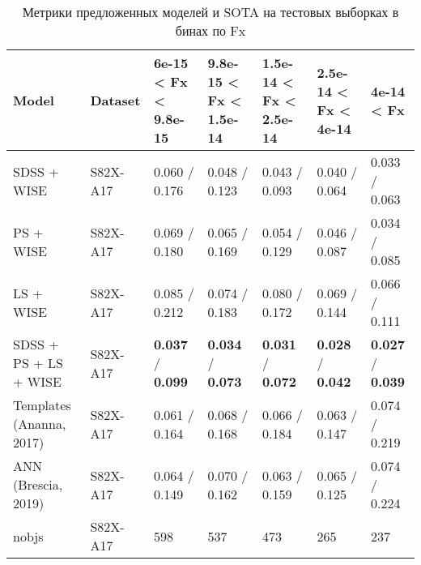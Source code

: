 \begin{table*}
    \centering
    \begin{tabular}{lllllll}
    \hline
                        Model &   Dataset &             6e-15 < Fx < 9.8e-15 &           9.8e-15 < Fx < 1.5e-14 &           1.5e-14 < Fx < 2.5e-14 &             2.5e-14 < Fx < 4e-14 &                       4e-14 < Fx \\
    \hline
                  SDSS + WISE &  S82X-A17 &                    0.060 / 0.176 &                    0.048 / 0.123 &                    0.043 / 0.093 &                    0.040 / 0.064 &                    0.033 / 0.063 \\
                    PS + WISE &  S82X-A17 &                    0.069 / 0.180 &                    0.065 / 0.169 &                    0.054 / 0.129 &                    0.046 / 0.087 &                    0.034 / 0.085 \\
                    LS + WISE &  S82X-A17 &                    0.085 / 0.212 &                    0.074 / 0.183 &                    0.080 / 0.172 &                    0.069 / 0.144 &                    0.066 / 0.111 \\
        SDSS + PS + LS + WISE &  S82X-A17 &  \textbf{0.037} / \textbf{0.099} &  \textbf{0.034} / \textbf{0.073} &  \textbf{0.031} / \textbf{0.072} &  \textbf{0.028} / \textbf{0.042} &  \textbf{0.027} / \textbf{0.039} \\
     Templates (Ananna, 2017) &  S82X-A17 &                    0.061 / 0.164 &                    0.068 / 0.168 &                    0.066 / 0.184 &                    0.063 / 0.147 &                    0.074 / 0.219 \\
          ANN (Brescia, 2019) &  S82X-A17 &                    0.064 / 0.149 &                    0.070 / 0.162 &                    0.063 / 0.159 &                    0.065 / 0.125 &                    0.074 / 0.224 \\
                        nobjs &  S82X-A17 &                              598 &                              537 &                              473 &                              265 &                              237 \\
    \hline
    \end{tabular}
    
    \caption{Метрики предложенных моделей и SOTA на тестовых выборках в бинах по Fx}
    \label{tab:metrics-rmag}
\end{table*}


